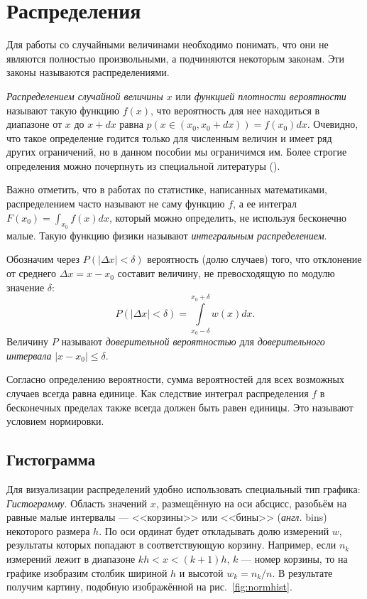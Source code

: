 \section{Распределения}

Для работы со случайными величинами необходимо понимать, что они не являются полностью произвольными, а подчиняются некоторым законам. Эти законы называются распределениями.

\emph{Распределением случайной величины} $x$ или \emph{функцией плотности вероятности} называют такую функцию $f(x)$, что вероятность для нее находиться в диапазоне от $x$ до $x+dx$ равна $p(x \in (x_0, x_0+dx)) = f(x_0) dx$. Очевидно, что такое определение годится только для численным величин и имеет ряд других ограничений, но в данном пособии мы ограничимся им. Более строгие определения можно почерпнуть из специальной литературы ().

Важно отметить, что в работах по статистике, написанных математиками, распределением часто называют не саму функцию $f$, а ее интеграл $F(x_0) = \int_{x_0}{f(x)dx}$, который можно определить, не используя бесконечно малые. Такую функцию физики называют \emph{интегральным распределением}.

Обозначим через $P\!\left(\left|\Delta x\right|<\delta\right)$ вероятность
(долю случаев) того, что отклонение от среднего $\Delta x=x-x_{0}$
составит величину, не превосходящую по модулю значение $\delta$:
\[
P\left(\left|\Delta x\right|<\delta\right)=\int\limits _{x_{0}-\delta}^{x_{0}+\delta}w\!\left(x\right)dx.
\]
Величину $P$ называют \emph{доверительной вероятностью} для \emph{доверительного
интервала} $\left|x-x_{0}\right|\le\delta$. 

Согласно определению вероятности, сумма вероятностей для всех возможных случаев всегда равна единице. Как следствие интеграл распределения $f$ в бесконечных пределах также всегда должен быть равен единицы. Это называют условием нормировки.

\subsection{Гистограмма}

Для визуализации распределений удобно использовать специальный тип графика: \emph{Гистограмму}.
Область значений $x$, размещённую на оси абсцисс, разобьём на равные малые интервалы --- <<корзины>>
или <<бины>> (\emph{англ.} bins) некоторого
размера $h$. По оси ординат будет откладывать долю измерений $w$,
результаты которых попадают в соответствующую корзину. Например, если
$n_{k}$ измерений лежит в диапазоне $kh<x<(k+1)h$, $k$ ---
номер корзины, то на графике изобразим столбик шириной $h$ и высотой
$w_{k}=n_{k}/n$. В результате получим картину, подобную изображённой
на рис.~\ref{fig:normhist}. 

